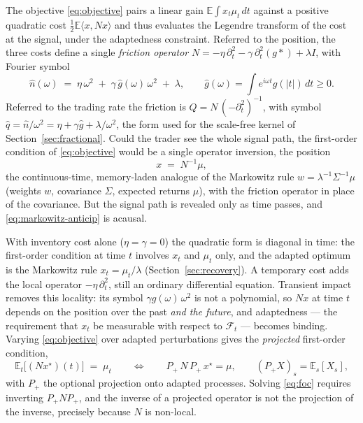 \documentclass[11pt]{article}
\newcommand{\E}{\mathbb{E}}
\newcommand{\F}{\mathcal{F}}
\theoremstyle{plain}
\theoremstyle{definition}
\theoremstyle{remark}
\begin{document}
The objective \eqref{eq:objective} pairs a linear gain $\E\int x_t\mu_t\,dt$ against a positive quadratic cost $\tfrac12\E\langle x,Nx\rangle$ and thus evaluates the Legendre transform of the cost at the signal, under the adaptedness constraint. Referred to the position, the three costs define a single \emph{friction operator} $N=-\eta\,\partial_t^2-\gamma\,\partial_t^2(g\ast)+\lambda I$, with Fourier symbol
\begin{equation}\label{eq:symbol}
\hat n(\omega) \;=\; \eta\,\omega^2 \;+\; \gamma\,\hat g(\omega)\,\omega^2 \;+\; \lambda,
\qquad \hat g(\omega) = \int e^{i\omega t}g(|t|)\,dt \ge 0.
\end{equation}
Referred to the trading rate the friction is $Q=N\,(-\partial_t^2)^{-1}$, with symbol $\hat q=\hat n/\omega^2=\eta+\gamma\hat g+\lambda/\omega^2$, the form used for the scale-free kernel of Section~\ref{sec:fractional}. Could the trader see the whole signal path, the first-order condition of \eqref{eq:objective} would be a single operator inversion, the position
\begin{equation}\label{eq:markowitz-anticip}
x \;=\; N^{-1}\mu,
\end{equation}
the continuous-time, memory-laden analogue of the Markowitz rule $w=\lambda^{-1}\Sigma^{-1}\mu$ (weights $w$, covariance $\Sigma$, expected returns $\mu$), with the friction operator in place of the covariance. But the signal path is revealed only as time passes, and \eqref{eq:markowitz-anticip} is acausal.

With inventory cost alone ($\eta=\gamma=0$) the quadratic form is diagonal in time: the first-order condition at time $t$ involves $x_t$ and $\mu_t$ only, and the adapted optimum is the Markowitz rule $x_t=\mu_t/\lambda$ (Section~\ref{sec:recovery}). A temporary cost adds the local operator $-\eta\,\partial_t^2$, still an ordinary differential equation. Transient impact removes this locality: its symbol $\gamma\hat g(\omega)\,\omega^2$ is not a polynomial, so $Nx$ at time $t$ depends on the position over the past \emph{and the future}, and adaptedness --- the requirement that $x_t$ be measurable with respect to $\F_t$ --- becomes binding. Varying \eqref{eq:objective} over adapted perturbations gives the \emph{projected} first-order condition,
\begin{equation}\label{eq:foc}
\E_t\bigl[(Nx^\star)(t)\bigr] \;=\; \mu_t
\qquad\Longleftrightarrow\qquad
P_+\,N\,P_+\,x^\star = \mu,
\qquad (P_+X)_s = \E_s[X_s],
\end{equation}
with $P_+$ the optional projection onto adapted processes. Solving \eqref{eq:foc} requires inverting $P_+NP_+$, and the inverse of a projected operator is not the projection of the inverse, precisely because $N$ is non-local.
\end{document}
